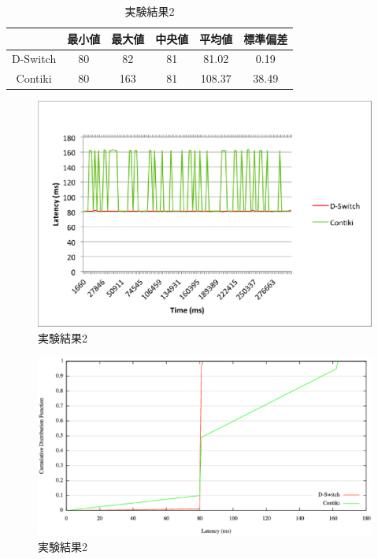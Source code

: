 \begin{table}[htbp]
  \centering
  \caption{実験結果2}
  \begin{tabular}{|c||c|c|c|c|c|} \hline
    \backslashbox{}{} & 最小値 & 最大値 & 中央値 & 平均値 & 標準偏差 \\ \hline \hline
    D-Switch & 80 & 82 & 81 & 81.02 & 0.19 \\ \hline
    Contiki & 80 & 163 & 81 & 108.37 & 38.49 \\ \hline
  \end{tabular}
  \label{tab:latency2}
\end{table}

\begin{figure}[htbp]
 \begin{center}
  \includegraphics[width=120mm]{./images/latency2.eps}
 \end{center}
 \caption{実験結果2}
 \label{fig:latency2}
\end{figure}

\begin{figure}[htbp]
 \begin{center}
  \includegraphics[width=120mm]{./images/cdf2.eps}
 \end{center}
 \caption{実験結果2}
 \label{fig:cdf2}
\end{figure}


